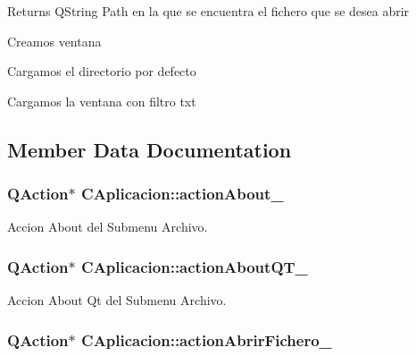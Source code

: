 \begin{DoxyReturn}{Returns}
Q\+String Path en la que se encuentra el fichero que se desea abrir 
\end{DoxyReturn}
Creamos ventana

Cargamos el directorio por defecto

Cargamos la ventana con filtro txt 

\subsection{Member Data Documentation}
\subsubsection[{\texorpdfstring{action\+About\+\_\+}{actionAbout_}}]{\setlength{\rightskip}{0pt plus 5cm}Q\+Action$\ast$ C\+Aplicacion\+::action\+About\+\_\+\hspace{0.3cm}{\ttfamily [private]}}\hypertarget{classCAplicacion_ac42dda1caacc0506c7015c79fde8416f}{}\label{classCAplicacion_ac42dda1caacc0506c7015c79fde8416f}


Accion About del Submenu Archivo. 

\subsubsection[{\texorpdfstring{action\+About\+Q\+T\+\_\+}{actionAboutQT_}}]{\setlength{\rightskip}{0pt plus 5cm}Q\+Action$\ast$ C\+Aplicacion\+::action\+About\+Q\+T\+\_\+\hspace{0.3cm}{\ttfamily [private]}}\hypertarget{classCAplicacion_af0ed23ead2d1c3aea79b724c3cb70249}{}\label{classCAplicacion_af0ed23ead2d1c3aea79b724c3cb70249}


Accion About Qt del Submenu Archivo. 

\subsubsection[{\texorpdfstring{action\+Abrir\+Fichero\+\_\+}{actionAbrirFichero_}}]{\setlength{\rightskip}{0pt plus 5cm}Q\+Action$\ast$ C\+Aplicacion\+::action\+Abrir\+Fichero\+\_\+\hspace{0.3cm}{\ttfamily [private]}}\hypertarget{classCAplicacion_a4fa499b5119ad7bcc86f53ace963cbbd}{}\label{classCAplicacion_a4fa499b5119ad7bcc86f53ace963cbbd}


